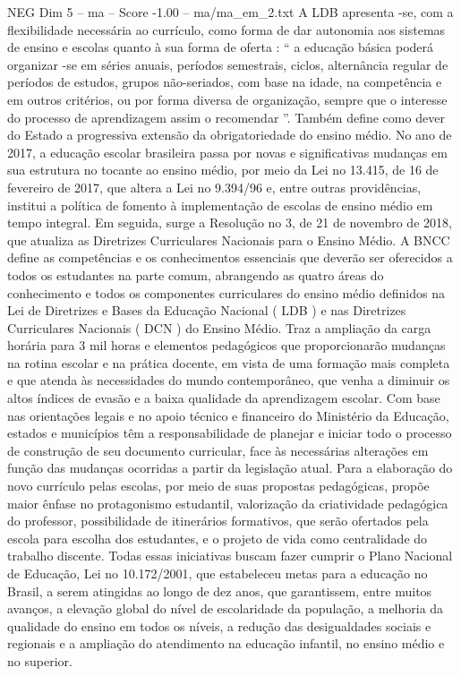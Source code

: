 \begin{textsample}{NEG Dim 5 – ma – Score -1.00 – ma/ma\_em\_2.txt}
A LDB apresenta -se, com a flexibilidade necessária ao currículo, como forma de dar autonomia aos sistemas de ensino e escolas quanto à sua forma de oferta : “ a educação básica poderá organizar -se em séries anuais, períodos semestrais, ciclos, alternância regular de períodos de estudos, grupos não-seriados, com base na idade, na competência e em outros critérios, ou por forma diversa de organização, sempre que o interesse do processo de aprendizagem assim o recomendar ”.
Também define como dever do Estado a progressiva extensão da obrigatoriedade do ensino médio.
No ano de 2017, a educação escolar brasileira passa por novas e significativas mudanças em sua estrutura no tocante ao ensino médio, por meio da Lei no 13.415, de 16 de fevereiro de 2017, que altera a Lei no 9.394/96 e, entre outras providências, institui a política de fomento à implementação de escolas de ensino médio em tempo integral.
Em seguida, surge a Resolução no 3, de 21 de novembro de 2018, que atualiza as Diretrizes Curriculares Nacionais para o Ensino Médio.
A BNCC define as competências e os conhecimentos essenciais que deverão ser oferecidos a todos os estudantes na parte comum, abrangendo as quatro áreas do conhecimento e todos os componentes curriculares do ensino médio definidos na Lei de Diretrizes e Bases da Educação Nacional ( LDB ) e nas Diretrizes Curriculares Nacionais ( DCN ) do Ensino Médio.
Traz a ampliação da carga horária para 3 mil horas e elementos pedagógicos que proporcionarão mudanças na rotina escolar e na prática docente, em vista de uma formação mais completa e que atenda às necessidades do mundo contemporâneo, que venha a diminuir os altos índices de evasão e a baixa qualidade da aprendizagem escolar.
Com base nas orientações legais e no apoio técnico e financeiro do Ministério da Educação, estados e municípios têm a responsabilidade de planejar e iniciar todo o processo de construção de seu documento curricular, face às necessárias alterações em função das mudanças ocorridas a partir da legislação atual.
Para a elaboração do novo currículo pelas escolas, por meio de suas propostas pedagógicas, propõe maior ênfase no protagonismo estudantil, valorização da criatividade pedagógica do professor, possibilidade de itinerários formativos, que serão ofertados pela escola para escolha dos estudantes, e o projeto de vida como centralidade do trabalho discente.
Todas essas iniciativas buscam fazer cumprir o Plano Nacional de Educação, Lei no 10.172/2001, que estabeleceu metas para a educação no Brasil, a serem atingidas ao longo de dez anos, que garantissem, entre muitos avanços, a elevação global do nível de escolaridade da população, a melhoria da qualidade do ensino em todos os níveis, a redução das desigualdades sociais e regionais e a ampliação do atendimento na educação infantil, no ensino médio e no superior.

\end{textsample}
